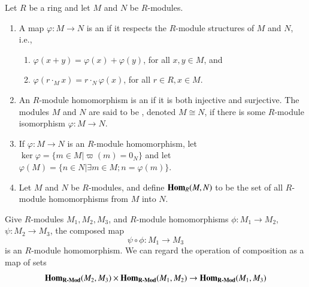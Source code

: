 \documentclass[12pt, a4paper, oneside, openright, titlepage]{book}
\begin{document}
\begin{defn}[D\&F]
    Let $R$ be a ring and let $M$ and $N$ be $R$-modules.
    \begin{enumerate}
        \item A map $\varphi:M\rightarrow N$ is an  if it respects the $R$-module structures of $M$ and $N$, i.e., \begin{enumerate}
                \item $\varphi(x+y) = \varphi(x)+\varphi(y)$, for all $x,y  \in M$, and 
                \item $\varphi(r\cdot_Mx) = r\cdot_N\varphi(x)$, for all $r \in R, x \in M$.
        \end{enumerate}
        \item An $R$-module homomorphism is an  if it is both injective and surjective. The modules $M$ and $N$ are said to be , denoted $M\cong N$, if there is some $R$-module isomorphism $\varphi:M\rightarrow N$.
        \item If $\varphi:M\rightarrow N$ is an $R$-module homomorphism, let $\ker\varphi = \{m \in M\vert \varpi(m) = 0_N\}$ and let $\varphi(M) = \{n \in N\vert \exists m \in M; n = \varphi(m)\}$.
        \item Let $M$ and $N$ be $R$-modules, and define $\mathbf{Hom}_R(M,N)$ to be the set of all $R$-module homomorphisms from $M$ into $N$.
    \end{enumerate}
\end{defn}


\begin{rmk}
    Give $R$-modules $M_1,M_2,M_3$, and $R$-module homomorphisms $\phi:M_1\rightarrow M_2$, $\psi:M_2\rightarrow M_3$, the composed map \begin{equation}
        \psi \circ \phi:M_1\rightarrow M_3
    \end{equation}
    is an $R$-module homomorphism. We can regard the operation of composition as a map of sets \begin{equation}
        \mathbf{Hom}_{\normalfont\textbf{R-Mod}}(M_2,M_3)\times\mathbf{Hom}_{\normalfont\textbf{R-Mod}}(M_1,M_2) \rightarrow \mathbf{Hom}_{\normalfont\textbf{R-Mod}}(M_1,M_3)
    \end{equation}
\end{rmk}
\end{document}
